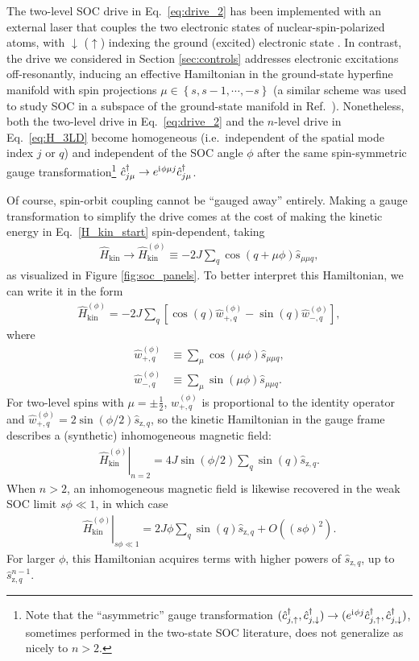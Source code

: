 \documentclass[aps,pra,nofootinbib,twocolumn,superscriptaddress]{revtex4-2}
\renewcommand{\t}{\text} %
\newcommand{\p}[1]{\left(#1\right)} %
\renewcommand{\sp}[1]{\left[#1\right]} %
\renewcommand{\set}[1]{\left\{#1\right\}} %
\renewcommand{\i}{\mathrm{i}\mkern1mu} %
\newcommand{\1}{\mathds{1}}
\renewcommand{\c}{\hat c}
\newcommand{\s}{\hat s}
\renewcommand{\H}{\hat H}
\newcommand{\up}{\uparrow}
\newcommand{\dn}{\downarrow}
\newcommand{\z}{\text{z}}
\begin{document}
The two-level SOC drive in Eq.~\eqref{eq:drive_2} has been implemented with an external laser that couples the two electronic states of nuclear-spin-polarized atoms, with $\dn$ ($\up$) indexing the ground (excited) electronic state \cite{wall2016synthetic, livi2016synthetic, kolkowitz2016spinorbitcoupled, bromley2018dynamics, he2019engineering}.
In contrast, the drive we considered in Section \ref{sec:controls} addresses electronic excitations off-resonantly, inducing an effective Hamiltonian in the ground-state hyperfine manifold with spin projections $\mu\in\set{s,s-1,\cdots,-s}$ (a similar scheme was used to study SOC in a subspace of the ground-state manifold in Ref.~\cite{mancini2015observation}).
Nonetheless, both the two-level drive in Eq.~\eqref{eq:drive_2} and the $n$-level drive in Eq.~\eqref{eq:H_3LD} become homogeneous (i.e.~independent of the spatial mode index $j$ or $q$) and independent of the SOC angle $\phi$ after the same spin-symmetric gauge transformation\footnote{Note that the ``asymmetric'' gauge transformation $(\c_{j,\up}^\dag,\c_{j,\dn}^\dag)\to(e^{\i\phi j} \c_{j,\up}^\dag,\c_{j,\dn}^\dag)$, sometimes performed in the two-state SOC literature, does not generalize as nicely to $n>2$.} $\c_{j\mu}^\dag\to e^{\i\phi\mu j} \c_{j\mu}^\dag$.

Of course, spin-orbit coupling cannot be ``gauged away'' entirely.
Making a gauge transformation to simplify the drive comes at the cost of making the kinetic energy in Eq.~\eqref{H_kin_start} spin-dependent, taking
\begin{align}
  \H_{\t{kin}} \to \H_{\t{kin}}^{(\phi)}
  \equiv -2J \sum_q \cos\p{q+\mu\phi} \s_{\mu\mu q},
\end{align}
as visualized in Figure \ref{fig:soc_panels}.
To better interpret this Hamiltonian, we can write it in the form
\begin{align}
  \H_{\t{kin}}^{(\phi)}
  = -2J \sum_q
  \sp{\cos\p{q} \hat w_{+,q}^{(\phi)} - \sin\p{q} \hat w_{-,q}^{(\phi)}},
\end{align}
where
\begin{align}
  \hat w_{+,q}^{(\phi)} &\equiv \sum_\mu \cos\p{\mu\phi} \s_{\mu\mu q}, \\
  \hat w_{-,q}^{(\phi)} &\equiv \sum_\mu \sin\p{\mu\phi} \s_{\mu\mu q}.
\end{align}
For two-level spins with $\mu=\pm\frac12$, $\hat w_{+,q}^{(\phi)}$ is proportional to the identity operator and $\hat w_{+,q}^{(\phi)} = 2\sin\p{\phi/2} \s_{\z,q}$, so the kinetic Hamiltonian in the gauge frame describes a (synthetic) inhomogeneous magnetic field:
\begin{align}
  \left. \H_{\t{kin}}^{(\phi)} \right|_{n=2}
  = 4 J \sin\p{\phi/2} \sum_q \sin\p{q} \s_{\z,q}.
\end{align}
When $n>2$, an inhomogeneous magnetic field is likewise recovered in the weak SOC limit $s\phi\ll1$, in which case
\begin{align}
  \left. \H_{\t{kin}}^{(\phi)} \right|_{s\phi\ll1}
  = 2J\phi \sum_q \sin\p{q} \s_{\z,q} + O\p{(s\phi)^2}.
\end{align}
For larger $\phi$, this Hamiltonian acquires terms with higher powers of $\s_{\z,q}$, up to $\s_{\z,q}^{n-1}$.
\end{document}
